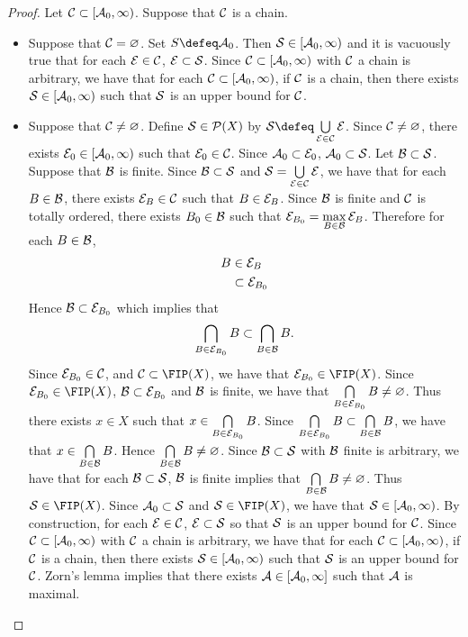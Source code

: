 \documentclass{book}
\begin{document}
	\begin{proof}
		Let $\mathcal{C} \subset [\mathcal{A}_0, \infty)$. Suppose that $\mathcal{C}$ is a chain. 
		\begin{itemize}
			\item Suppose that $\mathcal{C} = \varnothing$. Set $S \defeq \MA_0$. Then $\mathcal{S} \in [\mathcal{A}_0, \infty)$ and it is vacuously true that for each $\mathcal{E} \in \mathcal{C}$, $\mathcal{E} \subset \mathcal{S}$. Since $\mathcal{C} \subset [\mathcal{A}_0, \infty)$ with $\mathcal{C}$ a chain is arbitrary, we have that for each $\mathcal{C} \subset [\mathcal{A}_0, \infty)$, if $\mathcal{C}$ is a chain, then there exists $\mathcal{S} \in [\mathcal{A}_0, \infty)$ such that $\mathcal{S}$ is an upper bound for $\mathcal{C}$.
			\item Suppose that $\mathcal{C} \neq \varnothing$. Define $\mathcal{S} \in \mathcal{P}(X)$ by $\MS \defeq \bigcup\limits_{\ME \in \MC} \ME$. Since $\mathcal{C} \neq \varnothing$, there exists $\mathcal{E}_0 \in [\mathcal{A}_0, \infty)$ such that $\mathcal{E}_0 \in \mathcal{C}$. Since $\mathcal{A}_0 \subset \mathcal{E}_0$, $\mathcal{A}_0 \subset \mathcal{S}$. Let $\mathcal{B} \subset \mathcal{S}$. Suppose that $\mathcal{B}$ is finite. Since $\mathcal{B} \subset \mathcal{S}$ and $\mathcal{S} = \bigcup\limits_{\mathcal{E} \in \mathcal{C}} \mathcal{E}$, we have that for each $B \in \mathcal{B}$, there exists $\mathcal{E}_B \in \mathcal{C}$ such that $B \in \mathcal{E}_B$. Since $\mathcal{B}$ is finite and $\mathcal{C}$ is totally ordered, there exists $B_0 \in \mathcal{B}$ such that $\mathcal{E}_{B_0} = \max\limits_{B \in \mathcal{B}} \mathcal{E}_B$. Therefore for each $B \in \mathcal{B}$, 
			\begin{align*}
				B 
				& \in \mathcal{E}_B \\
				& \subset \mathcal{E}_{B_0}  
			\end{align*}
			Hence $\mathcal{B} \subset \mathcal{E}_{B_0}$ which implies that 
			$$\bigcap\limits_{B \in \mathcal{E}_{B_0}} B \subset \bigcap\limits_{B \in \mathcal{B}} B. $$ 
			Since $\mathcal{E}_{B_0} \in \mathcal{C}$, and $\MC \subset \FIP(X)$, we have that $\ME_{B_0} \in \FIP(X)$. Since $\ME_{B_0} \in \FIP(X)$, $\mathcal{B} \subset \mathcal{E}_{B_0}$ and $\mathcal{B}$ is finite, we have that $\bigcap\limits_{B \in \mathcal{E}_{B_0}} B \neq \varnothing$. Thus there exists $x \in X$ such that $x \in \bigcap\limits_{B \in \mathcal{E}_{B_0}} B$. Since $\bigcap\limits_{B \in \mathcal{E}_{B_0}} B \subset \bigcap\limits_{B \in \mathcal{B}} B$, we have that $x \in \bigcap\limits_{B \in \mathcal{B}} B$. Hence $ \bigcap\limits_{B \in \mathcal{B}} B \neq \varnothing$. Since $\mathcal{B} \subset \mathcal{S}$ with $\mathcal{B}$ finite is arbitrary, we have that for each $\mathcal{B} \subset \mathcal{S}$, $\mathcal{B}$ is finite implies that $ \bigcap\limits_{B \in \mathcal{B}} B \neq \varnothing$. Thus $\MS \in \FIP(X)$. Since $\mathcal{A}_0 \subset \mathcal{S}$ and $\MS \in \FIP(X)$, we have that $\mathcal{S} \in [\mathcal{A}_0, \infty)$. By construction, for each $\mathcal{E} \in \mathcal{C}$, $\mathcal{E} \subset \mathcal{S}$ so that $\mathcal{S}$ is an upper bound for $\mathcal{C}$. Since $\mathcal{C} \subset [\mathcal{A}_0, \infty)$ with $\mathcal{C}$ a chain is arbitrary, we have that for each $\mathcal{C} \subset [\mathcal{A}_0, \infty)$, if $\mathcal{C}$ is a chain, then there exists $\mathcal{S} \in [\mathcal{A}_0, \infty)$ such that $\mathcal{S}$ is an upper bound for $\mathcal{C}$. Zorn's lemma implies that there exists $\mathcal{A} \in [\mathcal{A}_0, \infty]$ such that $\mathcal{A}$ is maximal. 
		\end{itemize}
	\end{proof}
\end{document}
